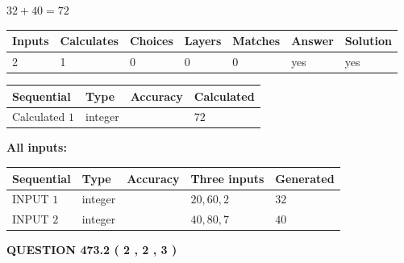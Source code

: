 \documentclass[12pt]{article}
\begin{document}
 

$ %
32 +  %
40=   %
72$
 
 
\noindent{}
 
 

 
   
   
   
   
\noindent\begin{tabular}{|l|l|l|l|l|l|l|}
 \hline
Inputs & Calculates & Choices & Layers & Matches & Answer & Solution \\ \hline
 2  & 
 1  & 
 0
  & 
 0  & 
 0  & 
  yes & 
  yes 
  \\ \hline
 \end{tabular}
   
   
   
   
\noindent{}
   
   
  
  
\noindent\begin{tabular}{|l|l|l|l|}
\hline
 Sequential & Type & Accuracy & Calculated \\ 
\hline
 
 
  Calculated $  1 $ & integer &  & 
  $ 72 $ 
 \\  \hline  
 \end{tabular}
   
   
   
   
\noindent\vspace{0.1in}\hspace{-0.08in} {\textbf{\Large{All inputs: }}}
   
   
  
  
\noindent\begin{tabular}{|l|l|l|l|l|}
\hline
 Sequential & Type & Accuracy & Three inputs & Generated \\ 
\hline
 
 
  INPUT $  1 $ & integer &  & $
 20
 , 
 60
 , 
 2
 $ & $ 32 $ 
 \\  \hline  
 
 
  INPUT $  2 $ & integer &  & $
 40
 , 
 80
 , 
 7
 $ & $ 40 $ 
 \\  \hline  
 \end{tabular}
   
   
  
\vspace{0.2in}
  
{\textbf{\Large{QUESTION
473.2 
 ( 2 , 2 , 3 )
}}}
  
\end{document}

